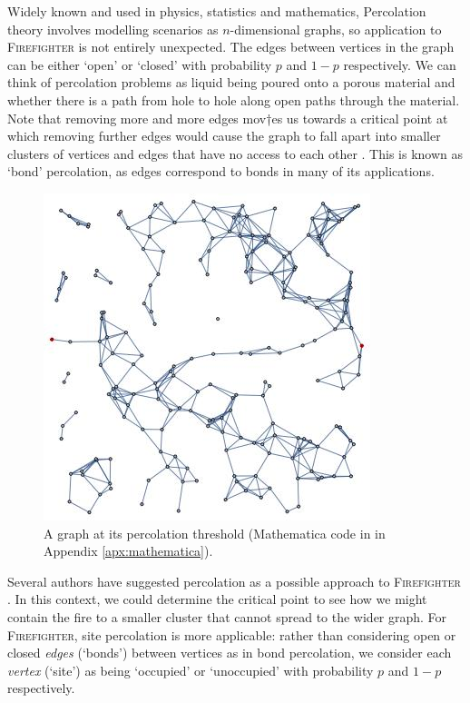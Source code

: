 \documentclass[11pt]{amsart}
\begin{document}
Widely known and used in physics, statistics and mathematics, Percolation theory involves modelling scenarios as $n$-dimensional graphs, so application to {\scshape Firefighter} is not entirely unexpected. The edges between vertices in the graph can be either `open' or `closed' with probability $p$ and $1-p$ respectively. We can think of percolation problems as liquid being poured onto a porous material and whether there is a path from hole to hole along open paths through the material. Note that removing more and more edges mov†es us towards a critical point at which removing further edges would cause the graph to fall apart into smaller clusters of vertices and edges that have no access to each other \cite{grimmett99}. This is known as `bond' percolation, as edges correspond to bonds in many of its applications.\\
\begin{figure}[ht]
	\centering
		\includegraphics[width=0.45\linewidth]{percolated-graph.jpg}
	\caption{A graph at its percolation threshold \cite{mathematica17} (Mathematica code in in Appendix \ref{apx:mathematica}).}
	\label{fig:percolated-graph}
\end{figure}
Several authors have suggested percolation as a possible approach to {\scshape Firefighter} \cite{finbow09}. In this context, we could determine the critical point to see how we might contain the fire to a smaller cluster that cannot spread to the wider graph. For {\scshape Firefighter}, site percolation is more applicable: rather than considering open or closed \emph{edges} (`bonds') between vertices as in bond percolation, we consider each \emph{vertex} (`site') as being `occupied' or `unoccupied' with probability $p$ and $1-p$ respectively.\\
\end{document}
